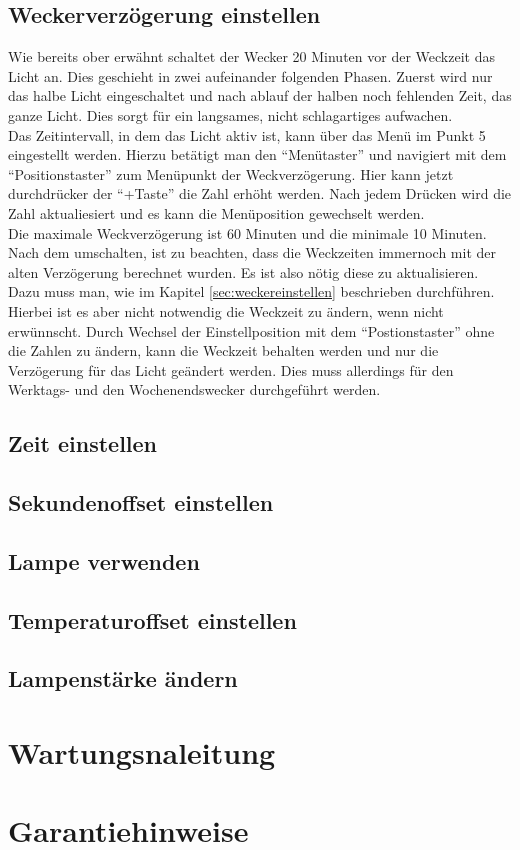 \documentclass[12pt,a4paper,titlepage,headinclude]{scrartcl}
\numberwithin{equation}{subsection}
\begin{document}
\subsection{Weckerverzögerung einstellen}
Wie bereits ober erwähnt schaltet der Wecker 20 Minuten vor der Weckzeit das Licht an.
Dies geschieht in zwei aufeinander folgenden Phasen.
Zuerst wird nur das halbe Licht eingeschaltet und nach ablauf der halben noch fehlenden Zeit, das ganze Licht.
Dies sorgt für ein langsames, nicht schlagartiges aufwachen.\\
Das Zeitintervall, in dem das Licht aktiv ist, kann über das Menü im Punkt 5 eingestellt werden.
Hierzu betätigt man den "`Menütaster"' und navigiert mit dem "`Positionstaster"' zum Menüpunkt der Weckverzögerung.
Hier kann jetzt durchdrücker der "`+Taste"' die Zahl erhöht werden.
Nach jedem Drücken wird die Zahl aktualiesiert und es kann die Menüposition gewechselt werden.\\
Die maximale Weckverzögerung ist 60 Minuten und die minimale 10 Minuten.
Nach dem umschalten, ist zu beachten, dass die Weckzeiten immernoch mit der alten Verzögerung berechnet wurden.
Es ist also nötig diese zu aktualisieren.
Dazu muss man, wie im Kapitel \ref{sec:weckereinstellen} beschrieben durchführen.
Hierbei ist es aber nicht notwendig die Weckzeit zu ändern, wenn nicht erwünnscht.
Durch Wechsel der Einstellposition mit dem "`Postionstaster"' ohne die Zahlen zu ändern, kann die Weckzeit behalten werden und nur die Verzögerung für das Licht geändert werden.
Dies muss allerdings für den Werktags- und den Wochenendswecker durchgeführt werden.

\subsection{Zeit einstellen}


\subsection{Sekundenoffset einstellen}


\subsection{Lampe verwenden}


\subsection{Temperaturoffset einstellen}


\subsection{Lampenstärke ändern}


\section{Wartungsnaleitung}
\label{sec:wartungsanleitung}

\section{Garantiehinweise}
\label{sec:Garantiehinweise}

\newpage
\printbibliography[heading=bibintoc]
\end{document}
